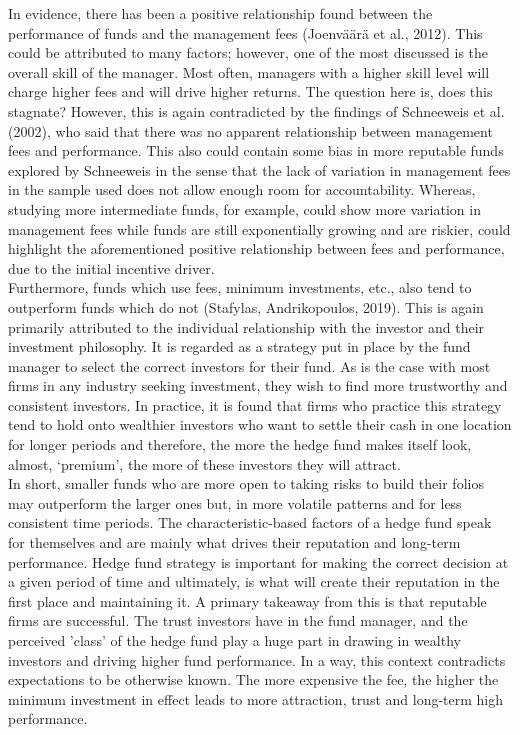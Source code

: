 \documentclass[11pt, english]{article}
\begin{document}
	In evidence, there has been a positive relationship found between the performance of funds and the management fees (Joenv\"{a}\"{a}r\"{a} et al., 2012). This could be attributed to many factors; however, one of the most discussed is the overall skill of the manager. Most often, managers with a higher skill level will charge higher fees and will drive higher returns. The question here is, does this stagnate? However, this is again contradicted by the findings of Schneeweis et al. (2002), who said that there was no apparent relationship between management fees and performance. This also could contain some bias in more reputable funds explored by Schneeweis in the sense that the lack of variation in management fees in the sample used does not allow enough room for accountability. Whereas, studying more intermediate funds, for example, could show more variation in management fees while funds are still exponentially growing and are riskier, could highlight the aforementioned positive relationship between fees and performance, due to the initial incentive driver.\\

	Furthermore, funds which use fees, minimum investments, etc., also tend to outperform funds which do not (Stafylas, Andrikopoulos, 2019). This is again primarily attributed to the individual relationship with the investor and their investment philosophy. It is regarded as a strategy put in place by the fund manager to select the correct investors for their fund. As is the case with most firms in any industry seeking investment, they wish to find more trustworthy and consistent investors. In practice, it is found that firms who practice this strategy tend to hold onto wealthier investors who want to settle their cash in one location for longer periods and therefore, the more the hedge fund makes itself look, almost, ‘premium’, the more of these investors they will attract.\\

	In short, smaller funds who are more open to taking risks to build their folios may outperform the larger ones but, in more volatile patterns and for less consistent time periods. The characteristic-based factors of a hedge fund speak for themselves and are mainly what drives their reputation and long-term performance. Hedge fund strategy is important for making the correct decision at a given period of time and ultimately, is what will create their reputation in the first place and maintaining it. A primary takeaway from this is that reputable firms are successful. The trust investors have in the fund manager, and the perceived 'class' of the hedge fund play a huge part in drawing in wealthy investors and driving higher fund performance. In a way, this context contradicts expectations to be otherwise known. The more expensive the fee, the higher the minimum investment in effect leads to more attraction, trust and long-term high performance.
\end{document}
